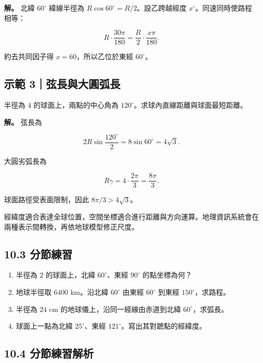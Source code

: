 \documentclass[11pt,a4paper]{article}
\providecommand{\tightlist}{%
  \setlength{\itemsep}{0pt}\setlength{\parskip}{0pt}}
\begin{document}
\textbf{解。} 北緯 \(60^\circ\) 緯線半徑為 \(R\cos60^\circ=R/2\)。設乙跨越經度 \(x^\circ\)。同速同時使路程相等：

\[
R\cdot\frac{30\pi}{180}
=\frac R2\cdot\frac{x\pi}{180}.
\]

約去共同因子得 \(x=60\)，所以乙位於東經 \(60^\circ\)。

\subsection{示範 3｜弦長與大圓弧長}\label{ux793aux7bc4-3ux5f26ux9577ux8207ux5927ux5713ux5f27ux9577}

半徑為 \(4\) 的球面上，兩點的中心角為 \(120^\circ\)。求球內直線距離與球面最短距離。

\textbf{解。} 弦長為

\[
2R\sin\frac{120^\circ}{2}
=8\sin60^\circ=4\sqrt3.
\]

大圓劣弧長為

\[
R\gamma=4\cdot\frac{2\pi}{3}=\frac{8\pi}{3}.
\]

球面路徑受表面限制，因此 \(8\pi/3>4\sqrt3\)。

經緯度適合表達全球位置，空間坐標適合進行距離與方向運算。地理資訊系統會在兩種表示間轉換，再依地球模型修正尺度。

\subsection{10.3 分節練習}\label{ux5206ux7bc0ux7df4ux7fd2-9}

\begin{enumerate}
\def\labelenumi{\arabic{enumi}.}
\tightlist
\item
  半徑為 \(2\) 的球面上，北緯 \(60^\circ\)、東經 \(90^\circ\) 的點坐標為何？
\item
  地球半徑取 \(6400\text{ km}\)。沿北緯 \(60^\circ\) 由東經 \(60^\circ\) 到東經 \(150^\circ\)，求路程。
\item
  半徑為 \(24\text{ cm}\) 的地球儀上，沿同一經線由赤道到北緯 \(60^\circ\)，求弧長。
\item
  球面上一點為北緯 \(25^\circ\)、東經 \(121^\circ\)。寫出其對蹠點的經緯度。
\end{enumerate}

\subsection{10.4 分節練習解析}\label{ux5206ux7bc0ux7df4ux7fd2ux89e3ux6790-9}
\end{document}
